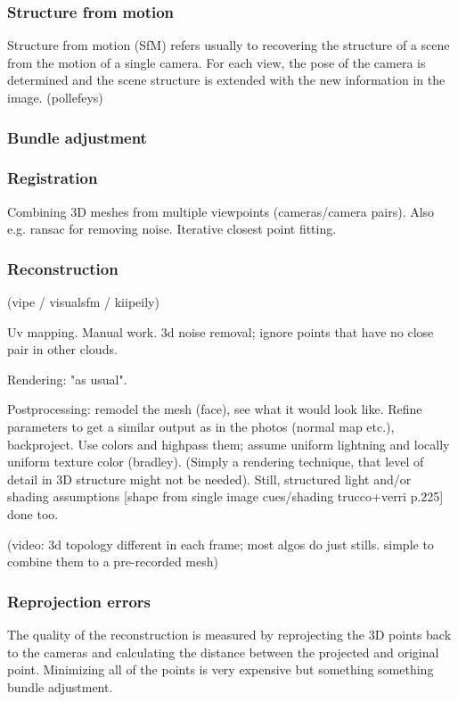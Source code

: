 \subsubsection{Structure from motion}

Structure from motion (SfM) refers usually to recovering the structure of a scene from the motion of a single camera.
For each view, the pose of the camera is determined and the scene structure is extended with the new information in the image.
(pollefeys)

\subsubsection{Bundle adjustment}

\subsubsection{Registration}

Combining 3D meshes from multiple viewpoints (cameras/camera pairs). Also e.g. ransac for removing noise. Iterative closest point fitting.

\subsubsection{Reconstruction}

(vipe / visualsfm / kiipeily)

Uv mapping. Manual work. 3d noise removal; ignore points that have no close pair in other clouds.

Rendering: "as usual".

Postprocessing: remodel the mesh (face), see what it would look like. Refine parameters to get a similar output as in the photos (normal map etc.), backproject. Use colors and highpass them; assume uniform lightning and locally uniform texture color (bradley). (Simply a rendering technique, that level of detail in 3D structure might not be needed). Still, structured light and/or shading assumptions [shape from single image cues/shading trucco+verri p.225] done too.


(video: 3d topology different in each frame; most algos do just stills. simple to combine them to a pre-recorded mesh)

\subsubsection{Reprojection errors}

The quality of the reconstruction is measured by reprojecting the 3D points back to the cameras and calculating the distance between the projected and original point.
Minimizing all of the points is very expensive but something something bundle adjustment.

